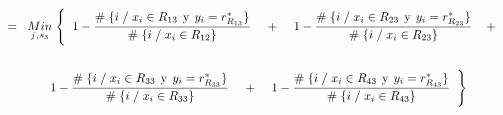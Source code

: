 \documentclass[
  11pt,
  a4paper,
]{article}
\begin{document}
\begin{gather*}
=\hspace{0.2cm}   \underset{j \hspace{0.02cm},\hspace{0.02cm} s_3}  {Min} \hspace{0.1cm}  \Biggl\{ \hspace{0.2cm}     1 - \dfrac{\# \hspace{0.1 cm}\lbrace i \hspace{0.1 cm}/\hspace{0.1 cm} x_i \in R_{13} \hspace{0.15 cm}\text{y}\hspace{0.15 cm} y_i = r^*_{R_{13}} \rbrace}{\# \hspace{0.1 cm}\lbrace i \hspace{0.1 cm}/\hspace{0.1 cm} x_i \in R_{12}  \rbrace}      \hspace{0.4cm} +  \hspace{0.4cm}   1 - \dfrac{\# \hspace{0.1 cm}\lbrace i \hspace{0.1 cm}/\hspace{0.1 cm} x_i \in R_{23} \hspace{0.15 cm}\text{y}\hspace{0.15 cm} y_i = r^*_{R_{23}} \rbrace}{\# \hspace{0.1 cm}\lbrace i \hspace{0.1 cm}/\hspace{0.1 cm} x_i \in R_{23}  \rbrace} \hspace{0.4cm} +    \hspace{0.4cm}   \\ \\     1 - \dfrac{\# \hspace{0.1 cm}\lbrace i \hspace{0.1 cm}/\hspace{0.1 cm} x_i \in R_{33} \hspace{0.15 cm}\text{y}\hspace{0.15 cm} y_i = r^*_{R_{33}} \rbrace}{\# \hspace{0.1 cm}\lbrace i \hspace{0.1 cm}/\hspace{0.1 cm} x_i \in R_{33}  \rbrace}   \hspace{0.4cm} +    \hspace{0.4cm}       1 - \dfrac{\# \hspace{0.1 cm}\lbrace i \hspace{0.1 cm}/\hspace{0.1 cm} x_i \in R_{43} \hspace{0.15 cm}\text{y}\hspace{0.15 cm} y_i = r^*_{R_{43}} \rbrace}{\# \hspace{0.1 cm}\lbrace i \hspace{0.1 cm}/\hspace{0.1 cm} x_i \in R_{43}  \rbrace} \hspace{0.2cm}    \Biggl\}  \\ \\ 

\end{gather*}
\end{document}
